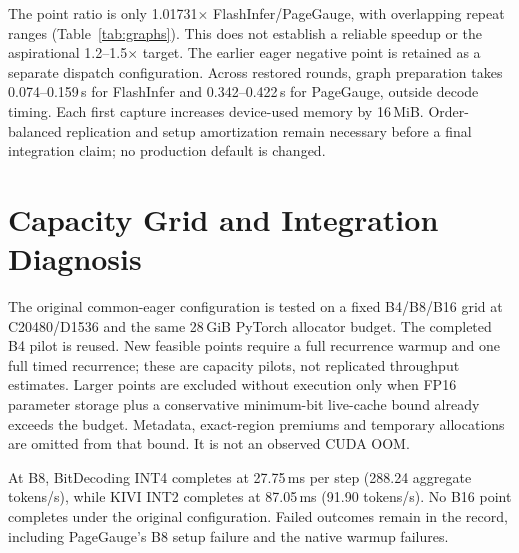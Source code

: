 \documentclass{article}
\begin{document}
\begin{table}[ht]
\caption{Matched attention-only graph pilot. One fresh process per arm,
one full recurrence warmup and three timed repeats on the same TRAIN workload.
Ranges are not confidence intervals.}
\label{tab:graphs}\centering\small

\end{table}

The point ratio is only 1.01731$\times$ FlashInfer/PageGauge, with overlapping
repeat ranges (Table~\ref{tab:graphs}). This does not establish a reliable
speedup or the aspirational 1.2--1.5$\times$ target. The earlier eager negative
point is retained as a separate dispatch configuration. Across restored rounds,
graph preparation takes 0.074--0.159\,s for FlashInfer and 0.342--0.422\,s for
PageGauge, outside decode timing. Each first capture increases device-used
memory by 16\,MiB. Order-balanced replication and setup amortization remain
necessary before a final integration claim; no production default is changed.

\section{Capacity Grid and Integration Diagnosis}
The original common-eager configuration is tested on a fixed B4/B8/B16 grid
at C20480/D1536 and the same 28\,GiB PyTorch allocator budget. The completed
B4 pilot is reused. New feasible points require a full recurrence warmup and
one full timed recurrence; these are capacity pilots, not replicated throughput
estimates. Larger points are excluded without execution only when FP16 parameter
storage plus a conservative minimum-bit live-cache bound already exceeds the
budget. Metadata, exact-region premiums and temporary allocations are omitted
from that bound. It is not an observed CUDA OOM.

\begin{table}[ht]
\caption{Original fixed capacity grid. OK: complete recurrence; OOM: measured
CUDA allocation failure; Bound: conservative analytical exclusion. These are
verified grid points, not global maximum batch sizes.}
\label{tab:capacity}\centering\small

\end{table}

At B8, BitDecoding INT4 completes at 27.75\,ms per step (288.24 aggregate
tokens/s), while KIVI INT2 completes at 87.05\,ms (91.90 tokens/s). No B16 point
completes under the original configuration. Failed outcomes remain in the
record, including PageGauge's B8 setup failure and the native warmup failures.
\end{document}
